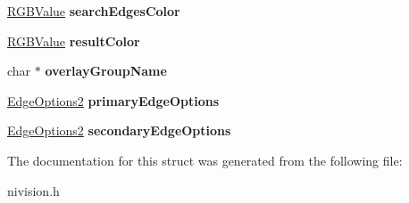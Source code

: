 \begin{DoxyCompactItemize}
\item 
\hypertarget{structFindTransformRectsOptions2__struct_a9551d3bc6d07fb40fe7e36b222e0ebc7}{\hyperlink{structRGBValue__struct}{\-R\-G\-B\-Value} {\bfseries search\-Edges\-Color}}\label{structFindTransformRectsOptions2__struct_a9551d3bc6d07fb40fe7e36b222e0ebc7}

\item 
\hypertarget{structFindTransformRectsOptions2__struct_a6d9a846655618846d2de014989fb1a4c}{\hyperlink{structRGBValue__struct}{\-R\-G\-B\-Value} {\bfseries result\-Color}}\label{structFindTransformRectsOptions2__struct_a6d9a846655618846d2de014989fb1a4c}

\item 
\hypertarget{structFindTransformRectsOptions2__struct_a323cd04f4d25781eb5077d067ff4c9a2}{char $\ast$ {\bfseries overlay\-Group\-Name}}\label{structFindTransformRectsOptions2__struct_a323cd04f4d25781eb5077d067ff4c9a2}

\item 
\hypertarget{structFindTransformRectsOptions2__struct_ab93fc8846508974ba07db684c35fa65c}{\hyperlink{structEdgeOptions2__struct}{\-Edge\-Options2} {\bfseries primary\-Edge\-Options}}\label{structFindTransformRectsOptions2__struct_ab93fc8846508974ba07db684c35fa65c}

\item 
\hypertarget{structFindTransformRectsOptions2__struct_a036dfd3be017c08e6bbbe9f454d0317d}{\hyperlink{structEdgeOptions2__struct}{\-Edge\-Options2} {\bfseries secondary\-Edge\-Options}}\label{structFindTransformRectsOptions2__struct_a036dfd3be017c08e6bbbe9f454d0317d}

\end{DoxyCompactItemize}


\-The documentation for this struct was generated from the following file\-:\begin{DoxyCompactItemize}
\item 
nivision.\-h\end{DoxyCompactItemize}
